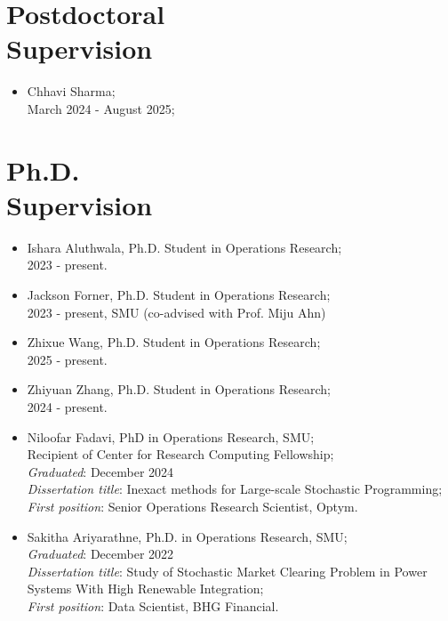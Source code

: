 \documentclass[hyperref, margin]{myResume}
\begin{document}
\begin{resume}
\section{Postdoctoral \\Supervision}
	\begin{itemize}[leftmargin=*]
		\item Chhavi Sharma;\\
		March 2024 - August 2025;
	\end{itemize}

\section{Ph.D. \\Supervision}
	\begin{itemize}[leftmargin=*]
		\item Ishara Aluthwala, Ph.D. Student in Operations Research;\\
		2023 - present. 
		\item Jackson Forner, Ph.D. Student in Operations Research;\\
		2023 - present, SMU (co-advised with Prof. Miju Ahn)
		\item Zhixue Wang, Ph.D. Student in Operations Research;\\		
		2025 - present. 
		
		\item Zhiyuan Zhang, Ph.D. Student in Operations Research;\\
		2024 - present. 	

		
		\item Niloofar Fadavi, PhD in Operations Research, SMU; \\
		Recipient of Center for Research Computing Fellowship; \\
		\emph{Graduated}: December 2024\\
		\emph{Dissertation title}: Inexact methods for Large-scale Stochastic Programming;\\
		\emph{First position}: Senior Operations Research Scientist, Optym.

		\item Sakitha Ariyarathne, Ph.D. in Operations Research, SMU;\\
		\emph{Graduated}: December 2022\\
		\emph{Dissertation title}: Study of Stochastic Market Clearing Problem in Power Systems With High Renewable Integration;\\
		\emph{First position}: Data Scientist, BHG Financial.


\end{itemize}
\end{resume}
\end{document}
